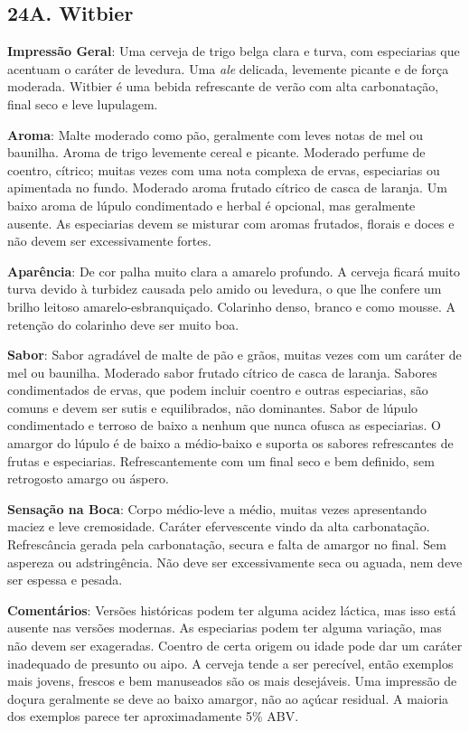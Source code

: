 \subsection*{24A. Witbier}
\textbf{Impressão Geral}: Uma cerveja de trigo belga clara e turva, com especiarias que acentuam o caráter de levedura. Uma \textit{ale} delicada, levemente picante e de força moderada. Witbier é uma bebida refrescante de verão com alta carbonatação, final seco e leve lupulagem.

\textbf{Aroma}: Malte moderado como pão, geralmente com leves notas de mel ou baunilha. Aroma de trigo levemente cereal e picante. Moderado perfume de coentro, cítrico; muitas vezes com uma nota complexa de ervas, especiarias ou apimentada no fundo. Moderado aroma frutado cítrico de casca de laranja. Um baixo aroma de lúpulo condimentado e herbal é opcional, mas geralmente ausente. As especiarias devem se misturar com aromas frutados, florais e doces e não devem ser excessivamente fortes.

\textbf{Aparência}: De cor palha muito clara a amarelo profundo. A cerveja ficará muito turva devido à turbidez causada pelo amido ou levedura, o que lhe confere um brilho leitoso amarelo-esbranquiçado. Colarinho denso, branco e como mousse. A retenção do colarinho deve ser muito boa.

\textbf{Sabor}: Sabor agradável de malte de pão e grãos, muitas vezes com um caráter de mel ou baunilha. Moderado sabor frutado cítrico de casca de laranja. Sabores condimentados de ervas, que podem incluir coentro e outras especiarias, são comuns e devem ser sutis e equilibrados, não dominantes. Sabor de lúpulo condimentado e terroso de baixo a nenhum que nunca ofusca as especiarias. O amargor do lúpulo é de baixo a médio-baixo e suporta os sabores refrescantes de frutas e especiarias. Refrescantemente com um final seco e bem definido, sem retrogosto amargo ou áspero.

\textbf{Sensação na Boca}: Corpo médio-leve a médio, muitas vezes apresentando maciez e leve cremosidade. Caráter efervescente vindo da alta carbonatação. Refrescância gerada pela carbonatação, secura e falta de amargor no final. Sem aspereza ou adstringência. Não deve ser excessivamente seca ou aguada, nem deve ser espessa e pesada.

\textbf{Comentários}: Versões históricas podem ter alguma acidez láctica, mas isso está ausente nas versões modernas. As especiarias podem ter alguma variação, mas não devem ser exageradas. Coentro de certa origem ou idade pode dar um caráter inadequado de presunto ou aipo. A cerveja tende a ser perecível, então exemplos mais jovens, frescos e bem manuseados são os mais desejáveis. Uma impressão de doçura geralmente se deve ao baixo amargor, não ao açúcar residual. A maioria dos exemplos parece ter aproximadamente 5\% ABV.

